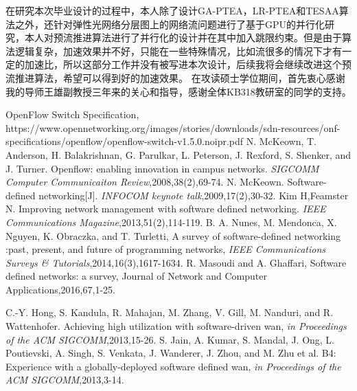 \documentclass[master]{thesis-uestc}
\begin{document}
在研究本次毕业设计的过程中，本人除了设计GA-PTEA，LR-PTEA和TESAA算法之外，还针对弹性光网络分层图上的网络流问题进行了基于GPU的并行化研究，本人对预流推进算法进行了并行化的设计并在其中加入跳限约束。但是由于算法逻辑复杂，加速效果并不好，只能在一些特殊情况，比如流很多的情况下才有一定的加速比，所以这部分工作并没有被写进本次设计，后续我将会继续改进这个预流推进算法，希望可以得到好的加速效果。
\thesisacknowledgement
在攻读硕士学位期间，首先衷心感谢我的导师王雄副教授三年来的关心和指导，感谢全体KB318教研室的同学的支持。

\begin{thebibliography}{1}
OpenFlow Switch Specification, https://www.opennetworking.org/images\newline/stories/downloads/sdn-resources/onf-specifications/openflow/openflow-switch-v1.5.0.noipr.pdf
N. McKeown, T. Anderson, H. Balakrishnan, G. Parulkar, L. Peterson, J. Rexford, S. Shenker, and J. Turner. Openflow: enabling innovation in campus networks. \emph{SIGCOMM Computer Communicaiton Review},2008,38(2),69-74.
N. McKeown. Software-defined networking[J]. \emph{INFOCOM keynote talk},2009,17(2),30-32.
Kim H,Feamster N. Improving network management with software defined networking. \emph{IEEE Communications Magazine},2013,51(2),114-119.
B. A. Nunes, M. Mendonca, X. Nguyen, K. Obraczka, and T. Turletti, A survey of software-defined networking :past, present, and future of programming networks, \emph{IEEE Communications Surveys \& Tutorials},2014,16(3),1617-1634.
R. Masoudi and A. Ghaffari, Software defined networks: a survey, Journal of Network and Computer Applications,2016,67,1-25.


C.-Y. Hong, S. Kandula, R. Mahajan, M. Zhang, V. Gill, M. Nanduri, and R. Wattenhofer. Achieving high utilization with software-driven wan, \emph{in Proceedings of the ACM SIGCOMM},2013,15-26.
S. Jain, A. Kumar, S. Mandal, J. Ong, L. Poutievski, A. Singh, S. Venkata, J. Wanderer, J. Zhou, and M. Zhu et al. B4: Experience with a globally-deployed software defined wan, \emph{in Proceedings of the ACM SIGCOMM},2013,3-14.


\end{thebibliography}
\end{document}
